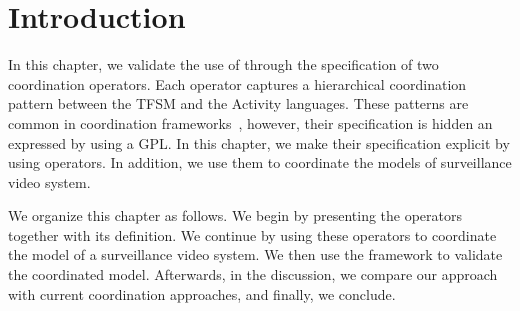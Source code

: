 \section{Introduction}
In this chapter, we validate the use of \bcool through the specification of two coordination operators. Each operator captures a hierarchical coordination pattern between the TFSM and the Activity languages. These patterns are common in coordination frameworks~\cite{giraultbib}, however, their specification is hidden an expressed by using a GPL. In this chapter, we make their specification explicit by using \bcool operators. In addition, we use them to coordinate the models of surveillance video system. 

We organize this chapter as follows. We begin by presenting the operators together with its \bcool definition. We continue by using these operators to coordinate the model of a surveillance video system. We then use the \bcool framework to validate the coordinated model. Afterwards, in the discussion, we compare our approach with current coordination approaches, and finally, we conclude.  